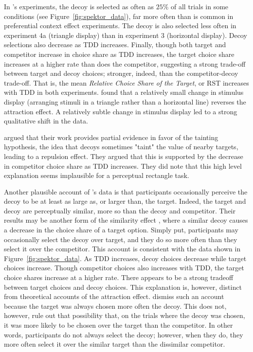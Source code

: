 In \textcite{spektorWhenGoodLooks2018b}'s experiments, the decoy is selected as often as $25\%$ of all trials in some conditions (see Figure~\ref{fig:spektor_data}), far more often than is common in preferential context effect experiments. The decoy is also selected less often in experiment 4a (triangle display) than in experiment 3 (horizontal display). Decoy selections also decrease as TDD increases. Finally, though both target and competitor increase in choice share as TDD increases, the target choice share increases at a higher rate than does the competitor, suggesting a strong trade-off between target and decoy choices; stronger, indeed, than the competitor-decoy trade-off. That is, the mean \textit{Relative Choice Share of the Target}, or RST \parencite{berkowitschRigorouslyTestingMultialternative2014b} increases with TDD in both experiments. \textcite{spektorWhenGoodLooks2018b} found that a relatively small change in stimulus display (arranging stimuli in a triangle rather than a horizontal line) reverses the attraction effect. A relatively subtle change in stimulus display led to a strong qualitative shift in the data. 

\textcite{spektorWhenGoodLooks2018b} argued that their work provides partial evidence in favor of the tainting hypothesis, the idea that decoys sometimes "taint" the value of nearby targets, leading to a repulsion effect. They argued that this is supported by the decrease in competitor choice share as TDD increases. They did note that this high level explanation seems implausible for a perceptual rectangle task.

Another plausible account of \textcite{spektorWhenGoodLooks2018b}'s data is that participants occasionally perceive the decoy to be at least as large as, or larger than, the target. Indeed, the target and decoy are perceptually similar, more so than the decoy and competitor. Their results may be another form of the similarity effect \parencite{tverskyEliminationAspectsTheory1972}, where a similar decoy causes a decrease in the choice share of a target option. Simply put, participants may occasionally select the decoy over target, and they do so more often than they select it over the competitor. This account is consistent with the data shown in Figure~\ref{fig:spektor_data}. As TDD increases, decoy choices decrease while target choices increase. Though competitor choices also increases with TDD, the target choice shares increase at a higher rate. There appears to be a strong tradeoff between target choices and decoy choices. This explanation is, however, distinct from theoretical accounts of the attraction effect. \textcite{spektorWhenGoodLooks2018b} dismiss such an account because the target was always chosen more often the decoy. This does not, however, rule out that possibility that, on the trials where the decoy was chosen, it was more likely to be chosen over the target than the competitor. In other words, participants do not always select the decoy; however, when they do, they more often select it over the similar target than the dissimilar competitor. 

